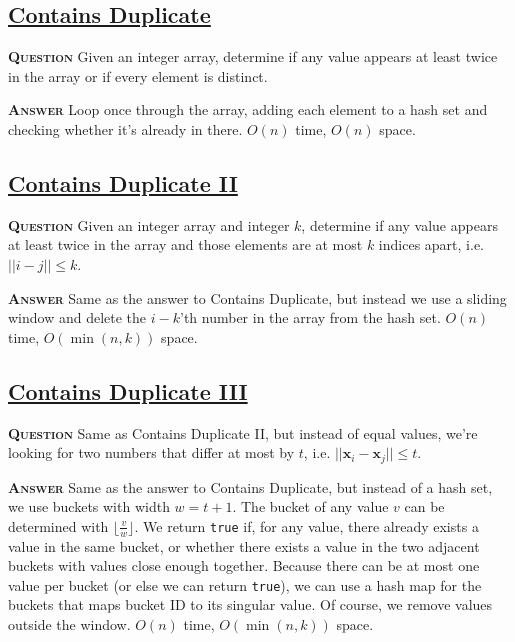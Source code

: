 \documentclass[table, xcdraw]{article}%
\begin{document}
\subsection{\href{https://leetcode.com/problems/contains-duplicate}{Contains Duplicate}}

\textsc{\textbf{Question}} Given an integer array, determine if any value appears at least twice in the array or if every element is distinct.

\textsc{\textbf{Answer}} Loop once through the array, adding each element to a hash set and checking whether it's already in there. $O(n)$ time, $O(n)$ space.

\subsection{\href{https://leetcode.com/problems/contains-duplicate-ii}{Contains Duplicate II}}

\textsc{\textbf{Question}} Given an integer array and integer $k$, determine if any value appears at least twice in the array and those elements are at most $k$ indices apart, i.e. $||i - j|| \leq k$.

\textsc{\textbf{Answer}} Same as the answer to Contains Duplicate, but instead we use a sliding window and delete the $i - k$'th number in the array from the hash set. $O(n)$ time, $O(\min(n,k))$ space.

\subsection{\href{https://leetcode.com/problems/contains-duplicate-iii}{Contains Duplicate III}}

\textsc{\textbf{Question}} Same as Contains Duplicate II, but instead of equal values, we're looking for two numbers that differ at most by $t$, i.e. $||\mathbf{x}_i - \mathbf{x}_j|| \leq t$.

\textsc{\textbf{Answer}} Same as the answer to Contains Duplicate, but instead of a hash set, we use buckets with width $w = t + 1$. The bucket of any value $v$ can be determined with $\lfloor \frac{v}{w} \rfloor$. We return \texttt{true} if, for any value, there already exists a value in the same bucket, or whether there exists a value in the two adjacent buckets with values close enough together. Because there can be at most one value per bucket (or else we can return \texttt{true}), we can use a hash map for the buckets that maps bucket ID to its singular value. Of course, we remove values outside the window. $O(n)$ time, $O(\min(n,k))$ space.
\end{document}
